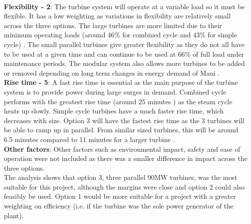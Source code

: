 \documentclass[11pt, oneside]{article}
\begin{document}
\\\textbf{Flexibility - 2}: The turbine system will operate at a variable load so it must be flexible. It has a low weighting as variations in flexibility are relatively small across the three options. The large turbines are more limited due to their minimum operating loads (around 46\% for combined cycle and 43\% for simple cycle) \cite{PDF:GElarge}. The small parallel turbines give greater flexibility as they do not all have to be used at a given time and can continue to be used at 66\% of full load under maintenance periods. The modular system also allows more turbines to be added or removed depending on long term changes in energy demand of Maui \cite{website:multipleunits}.
\\\textbf{Rise time - 5}: A fast rise time is essential as the main purpose of the turbine system is to provide power during large surges in demand. Combined cycle performs with the greatest rise time (around 25 minutes \cite{PDF:GElarge}) as the steam cycle heats up slowly. Simple cycle turbines have a much faster rise time, which decreases with size. Option 3 will have the fastest rise time as the 3 turbines will be able to ramp up in parallel. From similar sized turbines, this will be around 6.5 minutes \cite{PDF:GE} compared to 11 minutes for a larger turbine \cite{PDF:GElarge}. \cite{website:multipleunits}
\\\textbf{Other factors}: Other factors such as environmental impact, safety and ease of operation were not included as there was a smaller difference in impact across the three options.\\
The analysis shows that option 3, three parallel 90MW turbines, was the most suitable for this project, although the margins were close and option 2 could also feasibly be used. Option 1 would be more suitable for a project with a greater weighting on efficiency (i.e. if the turbine was the sole power generator of the plant).
\end{document}
